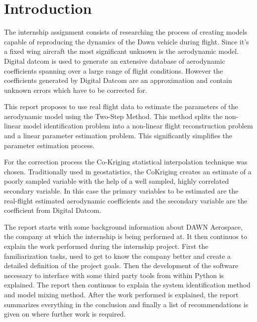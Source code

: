 \chapter{Introduction}


The internship assignment consists of researching the process of creating models capable of reproducing the dynamics of the Dawn vehicle during flight. Since it's a fixed wing aircraft the most significant unknown is the aerodynamic model. Digital datcom is used to generate an extensive database of aerodynamic coefficients spanning over a large range of flight conditions. However the coefficients generated by Digital Datcom are an approximation and contain unknown errors which have to be corrected for. 

This report proposes to use real flight data to estimate the parameters of the aerodynamic model using the Two-Step Method. This method splits the non-linear model identification problem into a non-linear flight reconstruction problem and a linear parameter estimation problem. This significantly simplifies the parameter estimation process.

For the correction process the Co-Kriging statistical interpolation technique was chosen. Traditionally used in geostatistics, the CoKriging creates an estimate of a poorly sampled variable with the help of a well sampled, highly correlated secondary variable. In this case the primary variables to be estimated are the real-flight estimated aerodynamic coefficients and the secondary variable are the coefficient from Digital Datcom.

The report starts with some background information about DAWN Aerospace, the company at which the internship is being performed at. It then continuos to explain the work performed during the internship project. First the familiarization tasks, used to get to know the company better and create a detailed definition of the project goals. Then the development of the software necessary to interface with some third party tools from within Python is explained. The report then continuos to explain the system identification method and model mixing method. 
After the work performed is explained, the report summarizes everything in the conclusion and finally a list of recommendations is given on where further work is required.


